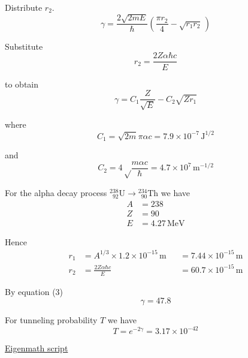 Distribute $r_2$.
\begin{equation*}
\gamma=\frac{2\sqrt{2mE}}{\hbar}
\left(
\frac{\pi r_2}{4}
-\sqrt{r_1r_2}\,
\right)
\end{equation*}

Substitute
\begin{equation*}
r_2=\frac{2Z\alpha\hbar c}{E}
\end{equation*}

to obtain
\begin{equation*}
\gamma=C_1\frac{Z}{\sqrt E}-C_2\sqrt{Zr_1}
\tag{3}
\end{equation*}

where
\begin{equation*}
C_1=\sqrt{2m}\pi\alpha c=7.9\times10^{-7}\,\text{J}^{1/2}
\end{equation*}

and
\begin{equation*}
C_2=4\sqrt\frac{m\alpha c}{\hbar}=4.7\times10^7\,\text{m}^{-1/2}
\end{equation*}

For the alpha decay process
${}^{238}_{\phantom{0}92}\mathrm U
\rightarrow{}^{234}_{\phantom{0}90}\mathrm{Th}$ we have
\begin{align*}
A&=238
\\
Z&=90
\\
E&=4.27\,\text{MeV}
\end{align*}

Hence
\begin{equation*}
\begin{aligned}
r_1&=A^{1/3}\times1.2\times10^{-15}\,\text{m} & &=7.44\times10^{-15}\,\text{m}
\\
r_2&=\frac{2Z\alpha\hbar c}{E} & &=60.7\times10^{-15}\,\text{m}
\end{aligned}
\tag{4}
\end{equation*}

By equation (3)
\begin{equation*}
\gamma=47.8
\end{equation*}

For tunneling probability $T$ we have
\begin{equation*}
T=e^{-2\gamma}=3.17\times10^{-42}
\end{equation*}

\href{https://georgeweigt.github.io/examples/alpha-decay-1-demo.html}{Eigenmath script}


